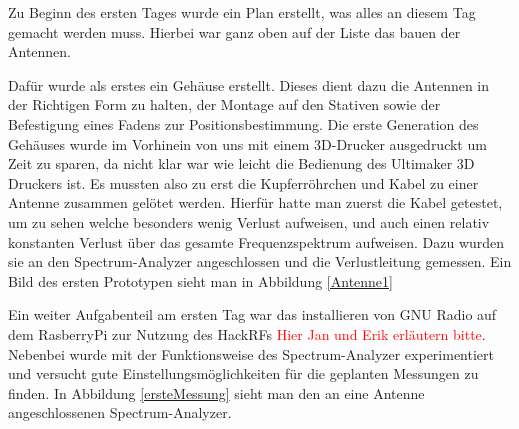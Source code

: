 \documentclass[titlepage,11pt,a4paper,ngerman]{article}
\begin{document}
Zu Beginn des ersten Tages wurde ein Plan erstellt, was alles an diesem Tag gemacht werden muss. Hierbei war ganz oben auf der Liste das bauen der Antennen.\par
Dafür wurde als erstes ein Gehäuse erstellt. Dieses dient dazu die Antennen in der Richtigen Form zu halten, der Montage auf den Stativen sowie der Befestigung eines Fadens zur Positionsbestimmung. Die erste Generation des Gehäuses wurde im Vorhinein von uns mit einem 3D-Drucker ausgedruckt um Zeit zu sparen, da nicht klar war wie leicht die Bedienung des Ultimaker 3D Druckers ist. Es mussten also zu erst die Kupferröhrchen und Kabel zu einer Antenne zusammen gelötet werden. Hierfür hatte man zuerst die Kabel getestet, um zu sehen welche besonders wenig Verlust aufweisen, und auch einen relativ konstanten Verlust über das gesamte Frequenzspektrum aufweisen. Dazu wurden sie an den Spectrum-Analyzer angeschlossen und die Verlustleitung gemessen. Ein Bild des ersten Prototypen sieht man in Abbildung \ref{Antenne1}\par
Ein weiter Aufgabenteil am ersten Tag war das installieren von GNU Radio auf dem RasberryPi zur Nutzung des HackRFs \textcolor{red}{Hier Jan und Erik erläutern bitte}. Nebenbei wurde mit der Funktionsweise des Spectrum-Analyzer experimentiert und versucht gute Einstellungsmöglichkeiten für die geplanten Messungen zu finden. In Abbildung \ref{ersteMessung} sieht man den an eine Antenne angeschlossenen Spectrum-Analyzer. 
\end{document}

